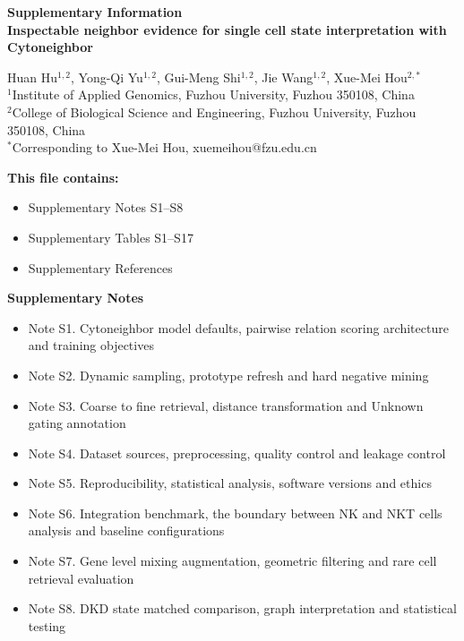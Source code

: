 \documentclass[11pt]{article}
\begin{document}
\begin{center}
{\Large \textbf{Supplementary Information}}\\[1.0em]
{\large \textbf{Inspectable neighbor evidence for single cell state interpretation with Cytoneighbor}}\\[1.0em]
\end{center}

\begin{flushleft}
{\large Huan Hu$^{1,2}$, Yong-Qi Yu$^{1,2}$, Gui-Meng Shi$^{1,2}$, Jie Wang$^{1,2}$, Xue-Mei Hou$^{2,\ast}$\\[0.6em]}
\small $^{1}$Institute of Applied Genomics, Fuzhou University, Fuzhou 350108, China\\
\small $^{2}$College of Biological Science and Engineering, Fuzhou University, Fuzhou 350108, China\\
\small $^{\ast}$Corresponding to Xue-Mei Hou, xuemeihou@fzu.edu.cn
\end{flushleft}

\vspace{1em}

\noindent\textbf{This file contains:}
\begin{itemize}
    \item Supplementary Notes S1--S8
    \item Supplementary Tables S1--S17
    \item Supplementary References
\end{itemize}

\noindent\textbf{Supplementary Notes}
\begin{itemize}
    \item Note S1. Cytoneighbor model defaults, pairwise relation scoring architecture and training objectives
    \item Note S2. Dynamic sampling, prototype refresh and hard negative mining
    \item Note S3. Coarse to fine retrieval, distance transformation and Unknown gating annotation
    \item Note S4. Dataset sources, preprocessing, quality control and leakage control
    \item Note S5. Reproducibility, statistical analysis, software versions and ethics
    \item Note S6. Integration benchmark, the boundary between NK and NKT cells analysis and baseline configurations
    \item Note S7. Gene level mixing augmentation, geometric filtering and rare cell retrieval evaluation
    \item Note S8. DKD state matched comparison, graph interpretation and statistical testing
\end{itemize}
\end{document}

